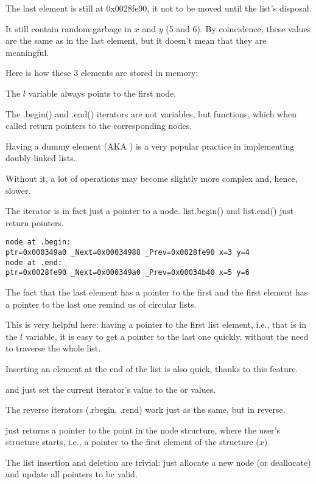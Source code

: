 The last element is still at 0x0028fe90,
it not to be moved until the list's disposal.

It still contain random garbage in $x$ and $y$ (5 and 6). 
By coincidence, these values are the same as in the last element, but it doesn't mean that they are meaningful.

Here is how these 3 elements are stored in memory:



The $l$ variable always points to the first node.

The .begin() and .end() iterators are not variables, but functions, 
which when called return pointers to the corresponding nodes.

Having a dummy element (\ac{AKA} ) is a very popular practice in implementing doubly-linked lists.

Without it, a lot of operations may become slightly more complex and, hence, slower.

The iterator is in fact just a pointer to a node.
list.begin() and list.end() just return pointers.

\begin{lstlisting}
node at .begin:
ptr=0x000349a0 _Next=0x00034988 _Prev=0x0028fe90 x=3 y=4
node at .end:
ptr=0x0028fe90 _Next=0x000349a0 _Prev=0x00034b40 x=5 y=6
\end{lstlisting}

The fact that the last element has a pointer to the first and the first element has a pointer 
to the last one remind us of circular lists.

This is very helpful here: having a pointer to the first list element,
i.e., that is in the $l$ variable,
it is easy to get a pointer to the last one quickly, without the need to traverse the whole list.

Inserting an element at the end of the list is also quick, thanks to this feature.

 and  just set the current iterator's value to the  or   values.%

The reverse iterators (.rbegin, .rend) work just as the same, but in reverse.

 just returns a pointer to the point 
in the node structure, where the user's structure starts, i.e., a pointer to the 
first element of the structure ($x$).

The list insertion and deletion are trivial: just allocate a new node (or deallocate) and update all pointers
to be valid.

